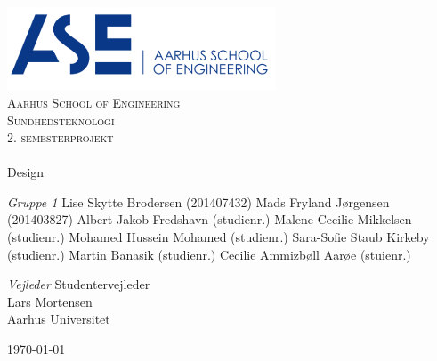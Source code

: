 \begin{titlingpage}
\begin{center}

~ \\[3cm]

\includegraphics[width=0.6\textwidth]{figurer/ASE}~\\[1cm]

\textsc{\LARGE Aarhus School of Engineering}\\[1.5cm]

\textsc{\Large Sundhedsteknologi}\\
\textsc{\Large 2. semesterprojekt}\\[0.5cm]

\noindent\makebox[\linewidth]{\rule{\textwidth}{0.4pt}}\\
[0.5cm]{\Huge Design}
\noindent\makebox[\linewidth]{\rule{\textwidth}{0.4pt}}

\end{center}

\textit{Gruppe 1} \newline
Lise Skytte Brodersen (201407432) \newline
Mads Fryland J\o rgensen (201403827) \newline
Albert Jakob Fredshavn (studienr.) \newline
Malene Cecilie Mikkelsen (studienr.) \newline		 
Mohamed Hussein Mohamed (studienr.) \newline 
Sara-Sofie Staub Kirkeby (studienr.) \newline
Martin Banasik (studienr.) \newline
Cecilie Ammizb\o ll Aar\o e (stuienr.) \newline 


\textit{Vejleder} \newline
Studentervejleder\\
Lars Mortensen\\
Aarhus Universitet


\vfill

\begin{center}
{\large \today}
\end{center}


\end{titlingpage}